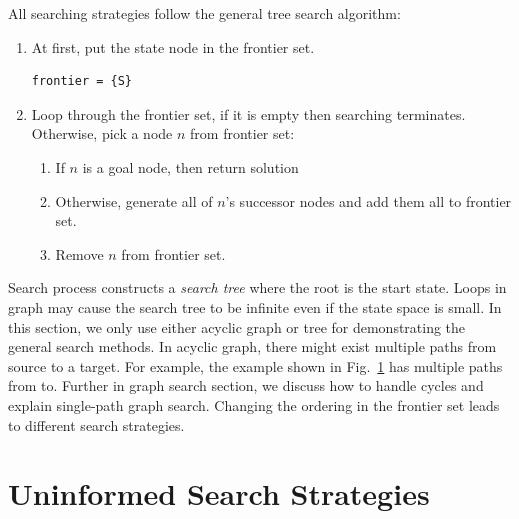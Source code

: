 \documentclass[main.tex]{subfiles}
\begin{document}
All searching strategies follow the general tree search algorithm:
\begin{enumerate}
    \item At first, put the state node in the frontier set. 
\begin{lstlisting}
frontier = {S}
\end{lstlisting}
\item Loop through the frontier set, if it is empty then searching terminates. Otherwise, pick a node $n$ from frontier set:
\begin{enumerate}
    \item If $n$ is a goal node, then return solution
    \item Otherwise, generate all of $n$'s successor nodes and add them all to frontier set.
    \item Remove $n$ from frontier set.
\end{enumerate}
\end{enumerate}
Search process constructs a \textit{search tree} where the root is the start state. Loops in graph may cause the search tree to be infinite even if the state space is small. In this section, we only use either acyclic graph or tree for demonstrating the general search methods. In acyclic graph, there might exist multiple paths from source to a target. For example, the example shown in Fig.~\ref{} has multiple paths from to. Further in graph search section, we discuss how to handle cycles and explain single-path graph search.  Changing the ordering in the frontier set leads to different search strategies.


\section{Uninformed Search Strategies}
\end{document}

